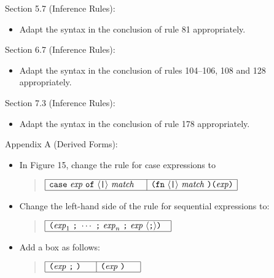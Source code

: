 \documentclass[twoside,titlepage]{article}
\begin{document}
\begin{appendix}
Section 5.7 (Inference Rules):
\begin{itemize}
\item Adapt the syntax in the conclusion of rule 81 appropriately.
\end{itemize}

Section 6.7 (Inference Rules):
\begin{itemize}
\item Adapt the syntax in the conclusion of rules 104--106, 108 and 128 appropriately.
\end{itemize}

Section 7.3 (Inference Rules):
\begin{itemize}
\item Adapt the syntax in the conclusion of rule 178 appropriately.
\end{itemize}

Appendix A (Derived Forms):
\begin{itemize}
\item In Figure 15, change the rule for case expressions to
  \begin{quote}
  $\begin{array}{|l|l|}
  \hline
  {\tt{case}}~\mathit{exp}~{\tt{of}}~\langle\mbox{\tt|}\rangle~\mathit{match}~~~
  & \mbox{\tt(}{\tt{fn}}~\langle\mbox{\tt|}\rangle~\mathit{match}~\mbox{\tt)(}\mathit{exp}\mbox{\tt)} \\
  \hline
  \end{array}$
  \end{quote}

\item Change the left-hand side of the rule for sequential expressions to:
  \begin{quote}
  $\begin{array}{|l|}
  \hline
  \mbox{\tt(}\mathit{exp}_1~\mbox{\tt;}~\cdots~\mbox{\tt;}~\mathit{exp}_n~\mbox{\tt;}~\mathit{exp}~\langle\mbox{\tt;}\rangle\mbox{\tt)}~~\\
  \hline
  \end{array}$
  \end{quote}

\item Add a box as follows:
  \begin{quote}
  $\begin{array}{|l|l|}
  \hline
  \mbox{\tt(}\mathit{exp}~\mbox{\tt;}~\mbox{\tt)}~~~~
  & \mbox{\tt(}\mathit{exp}~\mbox{\tt)}~~~~ \\
  \hline
  \end{array}$
  \end{quote}


\end{itemize}
\end{appendix}
\end{document}
